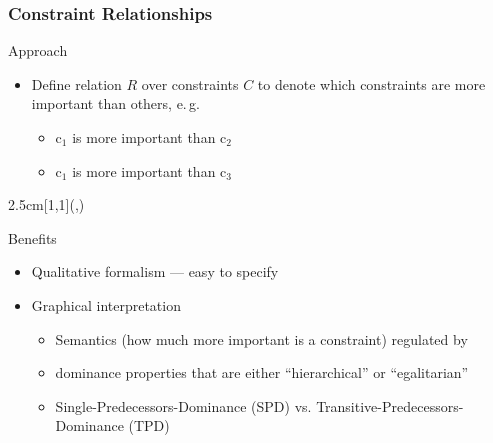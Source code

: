 \documentclass[10pt,xcolor={dvipsnames},fleqn]{beamer}
\newcommand{\cemph}[1]{\alert{#1}}
\begin{document}
\begin{frame}
\frametitle{Constraint Relationships}

Approach~\cite{Schiendorfer13}
\begin{itemize}
  \item Define relation $R$ over constraints $C$ to denote which constraints are more important than others, e.\,g.
\begin{itemize}
  \item $\mathrm{c}_1$ is more important than  $\mathrm{c}_2$

  \item $\mathrm{c}_1$ is more important than $\mathrm{c}_3$
\end{itemize}
\end{itemize}
\begin{textblock*}{2.5cm}[1,1](\textwidth-1.5cm,\textheight-4.03cm)
\end{textblock*}

\vspace*{5.6ex}

Benefits
\begin{itemize}
  \item \cemph{Qualitative} formalism --- easy to specify
  \item Graphical interpretation 
\begin{itemize}
 \item Semantics (\alert{how} much more important is a constraint) regulated by 
  \item \cemph{dominance properties} that are either ``hierarchical'' or ``egalitarian''
  \item Single-Predecessors-Dominance (SPD) vs. Transitive-Predecessors-Dominance (TPD)
\end{itemize}

\end{itemize}

\end{frame}
\end{document}
